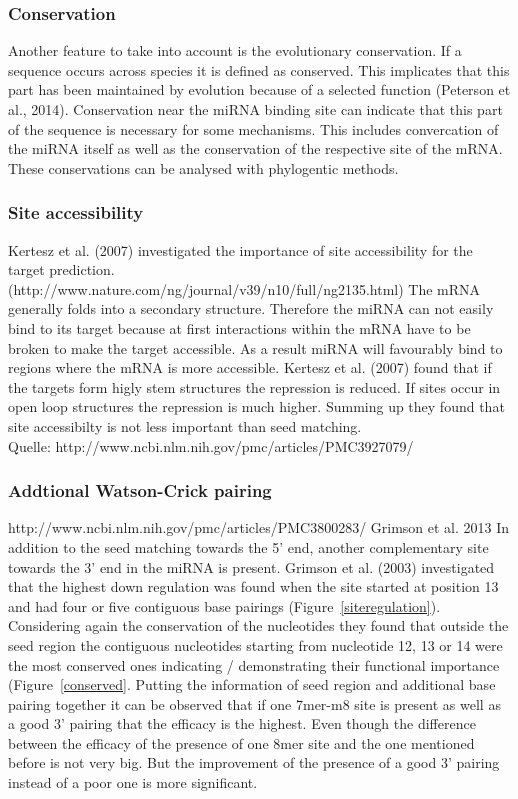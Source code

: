 \documentclass[12pt]{article}
\begin{document}
\subsubsection{Conservation}
Another feature to take into account is the evolutionary conservation. If a sequence occurs across species it is defined as conserved. This implicates that this part has been maintained by evolution because of a selected function (Peterson et al., 2014). Conservation near the miRNA binding site can indicate that this part of the sequence is necessary for some mechanisms. This includes convercation of the miRNA itself as well as the conservation of the respective site of the mRNA. These conservations can be analysed with phylogentic methods.


\subsubsection{Site accessibility}
Kertesz et al. (2007) investigated the importance of site accessibility for the target prediction. (http://www.nature.com/ng/journal/v39/n10/full/ng2135.html) The mRNA generally folds into a secondary structure. Therefore the miRNA can not easily bind to its target because at first interactions within the mRNA have to be broken to make the target accessible. As a result miRNA will favourably bind to regions where the mRNA is more accessible. Kertesz et al. (2007) found that if the targets form higly stem structures the repression is reduced. If sites occur in open loop structures the repression is much higher. Summing up they found that site accessibilty is not less important than seed matching. \\

Quelle: http://www.ncbi.nlm.nih.gov/pmc/articles/PMC3927079/\\

\subsubsection{Addtional Watson-Crick pairing}
http://www.ncbi.nlm.nih.gov/pmc/articles/PMC3800283/
Grimson et al. 2013
In addition to the seed matching towards the 5' end, another complementary site towards the 3' end in the miRNA is present. Grimson et al. (2003) investigated that the highest down regulation was found when the site started at position 13 and had four or five contiguous base pairings (Figure~\ref{siteregulation}). Considering again the conservation of the nucleotides they found that outside the seed region the contiguous nucleotides starting from nucleotide 12, 13 or 14 were the most conserved ones indicating / demonstrating their functional importance (Figure~\ref{conserved}. Putting the information of seed region and additional base pairing together it can be observed that if one 7mer-m8 site is present as well as a good 3' pairing that the efficacy is the highest. Even though the difference between the efficacy of the presence of one 8mer site and the one mentioned before is not very big. But the improvement of the presence of a good 3' pairing instead of a poor one is more significant.  
\end{document}
